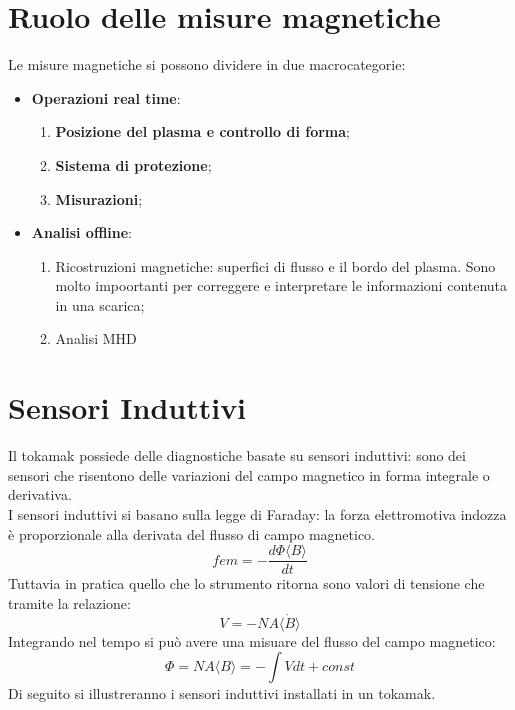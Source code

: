 \documentclass{article}
\begin{document}
\section{Ruolo delle misure magnetiche}
Le misure magnetiche si possono dividere in due macrocategorie:
\begin{itemize}
    \item \textbf{Operazioni real time}:\begin{enumerate}
        \item \textbf{Posizione del plasma e controllo di forma};
        \item \textbf{Sistema di protezione};
        \item \textbf{Misurazioni};
    \end{enumerate}
    \item \textbf{Analisi offline}:
    \begin{enumerate}
        \item Ricostruzioni magnetiche: superfici di flusso e il bordo del plasma. Sono molto impoortanti per correggere e interpretare le informazioni contenuta in una scarica;
        \item Analisi MHD
    \end{enumerate}
\end{itemize}
\section{Sensori Induttivi}
Il tokamak possiede delle diagnostiche basate su sensori induttivi: sono dei sensori che risentono delle variazioni del campo magnetico in forma integrale o derivativa.\\
I sensori induttivi si basano sulla legge di Faraday: la forza elettromotiva indozza è proporzionale alla derivata del flusso di campo magnetico.\begin{equation}
    fem=-\frac{d \Phi\langle B\rangle }{dt}
\end{equation}
Tuttavia in pratica quello che lo strumento ritorna sono valori di tensione che tramite la relazione:
\begin{equation}
    V=-NA\langle \dot{B}\rangle 
\end{equation}
Integrando nel tempo si può avere una misuare del flusso del campo magnetico:\begin{equation}
    \Phi=NA\langle B\rangle =-\int Vdt+const
\end{equation}
Di seguito si illustreranno i sensori induttivi installati in un tokamak.
\end{document}
